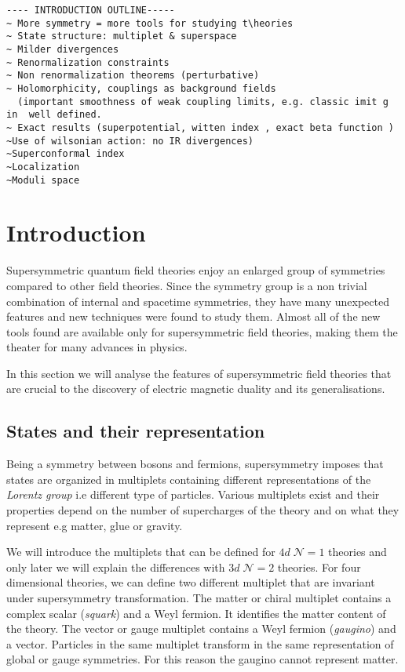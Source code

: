 \begin{lstlisting}
---- INTRODUCTION OUTLINE-----
~ More symmetry = more tools for studying t\heories
~ State structure: multiplet & superspace
~ Milder divergences 
~ Renormalization constraints
~ Non renormalization theorems (perturbative)
~ Holomorphicity, couplings as background fields 
  (important smoothness of weak coupling limits, e.g. classic imit g in  well defined.
~ Exact results (superpotential, witten index , exact beta function )
~Use of wilsonian action: no IR divergences)
~Superconformal index
~Localization
~Moduli space
\end{lstlisting}

\section{Introduction}
Supersymmetric quantum field theories enjoy an enlarged group of  symmetries compared to other field theories. 
Since the symmetry group is a non trivial combination of internal and spacetime symmetries, they have many unexpected features and new techniques were found to study them.
Almost all of the new tools found are available only for supersymmetric field theories, making them the theater for many advances in physics. 

In this section we will analyse the features of supersymmetric field theories that are crucial to the discovery of electric magnetic duality and its generalisations.

\subsection{States and their representation}

Being a symmetry between bosons and fermions, supersymmetry imposes that states are organized in multiplets containing different representations of the \emph{Lorentz group} i.e different type of  particles.
Various multiplets exist and their properties depend on the number of supercharges of the theory and on what they represent e.g matter, glue or gravity. 

We will introduce the multiplets that can be defined for $4d \; \mathcal{N} = 1$ theories and only later we will explain the differences with $3d \; \mathcal{N} = 2$ theories.
For four dimensional theories, we can define two different multiplet that are invariant under supersymmetry transformation.
The matter or chiral multiplet contains a complex scalar (\emph{squark}) and a Weyl fermion. It identifies the matter content of the theory.
The vector or gauge multiplet contains a Weyl fermion (\emph{gaugino}) and a vector.
Particles in the same multiplet transform in the same representation of global or gauge symmetries. For this reason the gaugino cannot represent matter.

